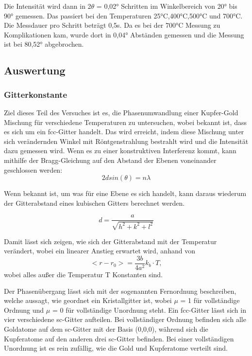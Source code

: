 \documentclass[
	a4paper,
	12pt,
	pagesize,
	ngerman
]{scrartcl}
\begin{document}
Die Intensität wird dann in 2$\theta$ = 0,02° Schritten im Winkelbereich von 20° bis 90° gemessen. Das passiert bei den Temperaturen 25°C,400°C,500°C und 700°C. Die Messdauer pro Schritt beträgt 0,5s. Da es bei der 700°C Messung zu Komplikationen kam, wurde dort in 0,04° Abständen gemessen und die Messung ist bei 80,52° abgebrochen.

\subsection{Auswertung}
\subsubsection{Gitterkonstante}
Ziel dieses Teil des Versuches ist es, die Phasenumwandlung einer Kupfer-Gold Mischung für verschiedene Temperaturen zu untersuchen, wobei bekannt ist, dass es sich um ein fcc-Gitter handelt. Das wird erreicht, indem diese Mischung unter sich verändernden Winkel mit Röntgenstrahlung bestrahlt wird und die Intensität dazu gemessen wird. Wenn es zu einer konstruktiven Interferenz kommt, kann mithilfe der Bragg-Gleichung auf den Abstand der Ebenen voneinander geschlossen werden:
\begin{equation}
2d sin(\theta) = n \lambda
\label{bragg}
\end{equation}

Wenn bekannt ist, um was für eine Ebene es sich handelt, kann daraus wiederum der Gitterabstand eines kubischen Gitters berechnet werden.

\begin{equation}
d = \frac{a}{\sqrt{h^{2}+k^{2}+l^{2}}}
\label{d}
\end{equation}

Damit lässt sich zeigen, wie sich der Gitterabstand mit der Temperatur verändert, wobei ein linearer Anstieg erwartet wird, anhand von 
\begin{equation}
<r-r_{0}> = \frac{3 b}{4 a^{2}} k_{b} \cdot T, 
\label{Temp}
\end{equation}
wobei alles außer die Temperatur T Konstanten sind.

Der Phasenübergang lässt sich mit der sogenannten Fernordnung beschreiben, welche aussagt, wie geordnet ein Kristallgitter ist, wobei $\mu$ = 1 für vollständige Ordnung und $\mu$ = 0 für vollständige Unordnung steht. Ein fcc-Gitter lässt sich in vier verschiedene sc-Gitter aufteilen. Bei vollständiger Ordnung befinden sich alle Goldatome auf dem sc-Gitter mit der Basis (0,0,0), während sich die Kupferatome auf den anderen drei sc-Gitter befinden.
Bei einer vollständigen Unordnung ist es rein zufällig, wie die Gold und Kupferatome verteilt sind.
\end{document}
